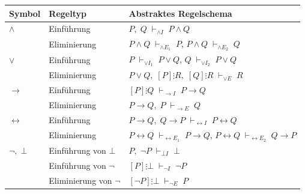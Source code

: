 \documentclass[main.tex]{subfiles}
\begin{document}
\begin{center}
  \renewcommand{\arraystretch}{1.3}
  \begin{tabularx}{\textwidth}{@{}l l X@{}}
    \toprule
    Symbol & Regeltyp & Abstraktes Regelschema \\
    \midrule
    $\land$
      & Einführung
      & \label{rule:AI}%
        \(P,\;Q \;\vdash_{\land I}\; P \land Q\) \\[0.6ex]
      & Eliminierung
      & \label{rule:AEn}%
        \label{rule:AE1}%
        \(P \land Q \;\vdash_{\land E_1}\; P\),\quad
        \label{rule:AE2}%
        \(P \land Q \;\vdash_{\land E_2}\; Q\) \\[0.9ex]

    $\lor$
      & Einführung
      & \label{rule:OI1}%
        \(P \;\vdash_{\lor I_1}\; P \lor Q\),\quad
        \label{rule:OI2}%
        \(Q \;\vdash_{\lor I_2}\; P \lor Q\) \\[0.6ex]
      & Eliminierung
      & \label{rule:OE}%
        \(P \lor Q,\; [P]\vdots R,\; [Q]\vdots R
          \;\vdash_{\lor E}\; R\) \\[0.9ex]

    $\rightarrow$
      & Einführung
      & \label{rule:RI}%
        \([P]\vdots Q \;\vdash_{\rightarrow I}\; P \rightarrow Q\) \\[0.6ex]
      & Eliminierung
      & \label{rule:RE}%
        \(P \rightarrow Q,\; P \;\vdash_{\rightarrow E}\; Q\) \\[0.9ex]

    $\leftrightarrow$
      & Einführung
      & \label{rule:LRI}%
        \(P \rightarrow Q,\; Q \rightarrow P
          \;\vdash_{\leftrightarrow I}\; P \leftrightarrow Q\) \\[0.6ex]
      & Eliminierung
      & \label{rule:LRE1}%
        \(P \leftrightarrow Q \;\vdash_{\leftrightarrow E_1}\;
          P \rightarrow Q\),\quad
        \label{rule:LRE2}%
        \(P \leftrightarrow Q \;\vdash_{\leftrightarrow E_2}\;
          Q \rightarrow P\) \\[0.9ex]

    $\neg,\;\bot$
      & Einführung von \(\bot\)
      & \label{rule:BI}%
        \(P,\;\neg P \;\vdash_{\bot I}\; \bot\) \\[0.6ex]
      & Einführung von \(\neg\)
      & \label{rule:CI}%
        \([P]\vdots \bot \;\vdash_{\neg I}\; \neg P\) \\[0.6ex]
      & Eliminierung von \(\neg\)
      & \label{rule:CE}%
        \([\neg P]\vdots \bot \;\vdash_{\neg E}\; P\) \\[0.9ex]


\end{tabularx}
\end{center}
\end{document}
